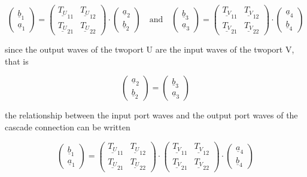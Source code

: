 \begin{equation}
\begin{pmatrix}
\underline{b}_{1}\\
\underline{a}_{1}
\end{pmatrix}
=
\begin{pmatrix}
\underline{T_U}_{11} & \underline{T_U}_{12}\\
\underline{T_U}_{21} & \underline{T_U}_{22}
\end{pmatrix}
\cdot
\begin{pmatrix}
\underline{a}_{2}\\
\underline{b}_{2}
\end{pmatrix}
\quad
\textrm{and}
\quad
\begin{pmatrix}
\underline{b}_{3}\\
\underline{a}_{3}
\end{pmatrix}
=
\begin{pmatrix}
\underline{T_V}_{11} & \underline{T_V}_{12}\\
\underline{T_V}_{21} & \underline{T_V}_{22}
\end{pmatrix}
\cdot
\begin{pmatrix}
\underline{a}_{4}\\
\underline{b}_{4}
\end{pmatrix}
\end{equation}

since the output waves of the twoport U are the input waves of the twoport V, that is

\begin{equation}
\begin{pmatrix}
\underline{a}_{2}\\
\underline{b}_{2}
\end{pmatrix}
=\begin{pmatrix}
\underline{b}_{3}\\
\underline{a}_{3}
\end{pmatrix}
\end{equation}

the relationship between the input port waves and the output port waves of the cascade connection can be written

\begin{equation}
\begin{pmatrix}
\underline{b}_{1}\\
\underline{a}_{1}
\end{pmatrix}
=
\begin{pmatrix}
\underline{T_U}_{11} & \underline{T_U}_{12}\\
\underline{T_U}_{21} & \underline{T_U}_{22}
\end{pmatrix}
\cdot
\begin{pmatrix}
\underline{T_V}_{11} & \underline{T_V}_{12}\\
\underline{T_V}_{21} & \underline{T_V}_{22}
\end{pmatrix}
\cdot
\begin{pmatrix}
\underline{a}_{4}\\
\underline{b}_{4}
\end{pmatrix}
\end{equation}

